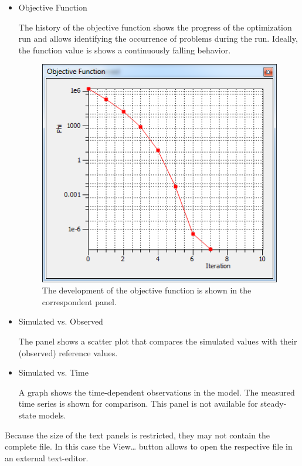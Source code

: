 \begin{itemize}
\item Objective Function

The history of the objective function shows the progress of the optimization run and allows identifying the occurrence of problems during the run. Ideally, the function value is shows a continuously falling behavior.

\begin{figure}
	\center 
	\includegraphics[width=\columnwidth]{figures/ObjectiveFunctionMinimization.png}
\caption{The development of the objective function is shown in the correspondent panel.}
\label{fig:fepest:ObjectiveFunctionMinimization}
\end{figure}

\item Simulated vs. Observed

The panel shows a scatter plot that compares the simulated values with their (observed) reference values.

\item	Simulated vs. Time

A graph shows the time-dependent observations in the model. The measured time series is shown for comparison. This panel is not available for steady-state models.
\end{itemize}

Because the size of the text panels is restricted, they may not contain the complete file. In this case the View… button allows to open the respective file in an external text-editor.

